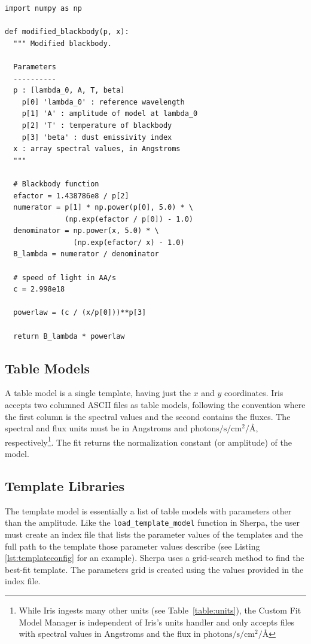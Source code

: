 \documentclass[preprint,authoryear,5p]{elsarticle}
\begin{document}
\begin{lstlisting}[style=python,
	caption={Example of a user-defined model that
can be dynamically loaded into Iris. The code, written as a Python function, 
implements a modified blackbody and can be combined 
in Iris with other built-in and custom components. Backslashes indicate line 
continuations.},
	label=lst:user_model_example]
import numpy as np

def modified_blackbody(p, x):
  """ Modified blackbody.

  Parameters
  ----------
  p : [lambda_0, A, T, beta]
    p[0] 'lambda_0' : reference wavelength
    p[1] 'A' : amplitude of model at lambda_0
    p[2] 'T' : temperature of blackbody
    p[3] 'beta' : dust emissivity index
  x : array spectral values, in Angstroms
  """

  # Blackbody function
  efactor = 1.438786e8 / p[2]
  numerator = p[1] * np.power(p[0], 5.0) * \
              (np.exp(efactor / p[0]) - 1.0)
  denominator = np.power(x, 5.0) * \
                (np.exp(efactor/ x) - 1.0)
  B_lambda = numerator / denominator

  # speed of light in AA/s
  c = 2.998e18

  powerlaw = (c / (x/p[0]))**p[3]

  return B_lambda * powerlaw
\end{lstlisting}

\subsection{Table Models} A table model is a single template, having just the
$x$ and $y$ coordinates. Iris accepts two columned ASCII files as table models,
following the convention where the first column is the spectral values
and the second contains the fluxes. The spectral and flux units must be in Angstroms
and $\mathrm{photons}/\mathrm{s}/\mathrm{cm}^{2}/\mbox{\AA}$, respectively\footnote{
While Iris ingests many other units (see Table~\ref{table:units}), the Custom Fit Model
Manager is independent of Iris's units handler and only accepts files with spectral 
values in Angstroms and the flux in 
$\mathrm{photons}/\mathrm{s}/\mathrm{cm}^{2}/\mbox{\AA}$}.
The fit returns the normalization constant (or amplitude) of the model.

\begin{sloppypar}
\subsection{Template Libraries} The template model is essentially a list of
table models with parameters other than the amplitude. Like the
\texttt{load\_template\_model} function in Sherpa, the user must create an index
file that lists the parameter values of the templates and the full path to the
template those parameter values describe (see Listing \ref{lst:templateconfig}
for an example). Sherpa uses a grid-search method to find the best-fit template.
The parameters grid is created using the values provided in the index file.
\end{sloppypar}
\end{document}

